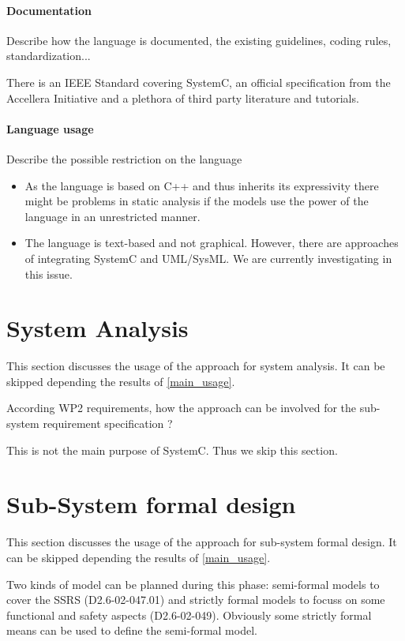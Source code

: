 \paragraph{Documentation} Describe how the language is documented, the existing guidelines, coding rules, standardization...

There is an IEEE Standard covering SystemC, an official specification from the Accellera Initiative and a plethora of third party literature and tutorials.

\paragraph{Language usage} Describe the possible restriction on the language

\begin{itemize}
\item As the language is based on C++ and thus inherits its expressivity there might be problems in static analysis if the models use the power of the language in an unrestricted manner.
\item The language is text-based and not graphical. However, there are approaches of integrating SystemC and UML/SysML. We are currently investigating in this issue.
\end{itemize}


\section{System Analysis}
This section discusses the usage of the approach for system analysis.
It can be skipped depending the results of \ref{main_usage}.

According WP2 requirements, how the approach can be involved for the sub-system requirement specification ?

\begin{author_comment}
This is not the main purpose of SystemC. Thus we skip this section.
\end{author_comment}

\section{Sub-System formal design}
This section discusses the usage of the approach for sub-system formal design.
It can be skipped depending the results of \ref{main_usage}.

Two kinds of model can be planned during this phase: semi-formal models to cover the SSRS (D2.6-02-047.01) and strictly formal models to focuss on some functional and safety aspects (D2.6-02-049). Obviously some strictly formal means can be used to define the semi-formal model.

